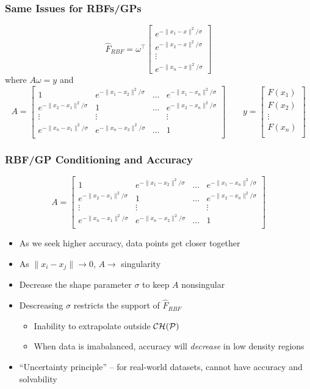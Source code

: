 \documentclass[aspectratio=169]{beamer}
\begin{document}
\begin{frame}\frametitle{Same Issues for RBFs/GPs}
$$
{\hat F}_{RBF} =
\omega^\top \left[ \begin{array}{c}
e^{-\|x_1 - x\|^2/\sigma}\\
e^{-\|x_2 - x\|^2/\sigma}\\
\vdots\\
e^{-\|x_n - x\|^2/\sigma}
\end{array} \right]
$$
\pause
where
$ A \omega = y $
and 
$$
A = 
\left[
\begin{array}{cccc}
1 & e^{-\|x_1 - x_2\|^2/\sigma} & \ldots & e^{-\|x_1 - x_n\|^2/\sigma} \\
e^{-\|x_2 - x_1\|^2/\sigma} & 1 & \ldots & e^{-\|x_2 - x_n\|^2/\sigma} \\
\vdots & \vdots &  & \vdots \\
e^{-\|x_n - x_1\|^2/\sigma} & e^{-\|x_n - x_2\|^2/\sigma} & \ldots & 1 \\
\end{array}
\right]
\qquad
y = 
\left[
\begin{array}{c}
F(x_1) \\
F(x_2) \\
\vdots \\
F(x_n) \\
\end{array}
\right]
$$

\end{frame}

\begin{frame}\frametitle{RBF/GP Conditioning and Accuracy}
$$
A = 
\left[
\begin{array}{cccc}
1 & e^{-\|x_1 - x_2\|^2/\sigma} & \ldots & e^{-\|x_1 - x_n\|^2/\sigma} \\
e^{-\|x_2 - x_1\|^2/\sigma} & 1 & \ldots & e^{-\|x_2 - x_n\|^2/\sigma} \\
\vdots & \vdots &  & \vdots \\
e^{-\|x_n - x_1\|^2/\sigma} & e^{-\|x_n - x_2\|^2/\sigma} & \ldots & 1 \\
\end{array}
\right]
$$
\begin{itemize}
\pause \item As we seek higher accuracy, data points get closer together
\pause \item As $\|x_i - x_j\| \rightarrow 0$, $A \rightarrow$ singularity
\pause \item Decrease the shape parameter $\sigma$ to keep $A$ nonsingular
\pause \item Descreasing $\sigma$ restricts the support of ${\hat F}_{RBF}$
\begin{itemize}
\pause
\item Inability to extrapolate outside ${\cal CH}({\cal P})$
\item When data is imabalanced, accuracy will {\it decrease} in low density
regions
\end{itemize}
\pause \item ``Uncertainty principle'' -- for real-world datasets, cannot
have accuracy and solvability
\end{itemize}
\end{frame}
\end{document}
